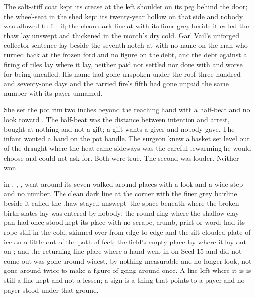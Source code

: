 The salt-stiff coat kept its crease at the left shoulder on its peg behind the door; the wheel-seat in the shed kept its twenty-year hollow on that side and nobody was allowed to fill it; the clean dark line at  with its finer grey beside it called the thaw lay unswept and thickened in the month's dry cold. Garl Vail's unforged collector sentence lay beside the seventh notch at  with no name on the man who turned back at the frozen ford and no figure on the debt, and the debt against a firing of tiles lay where it lay, neither paid nor settled nor done with and worse for being uncalled. His name had gone unspoken under the roof three hundred and seventy-one days and the carried fire's fifth had gone unpaid the same number with its payer unnamed.

She set the pot rim two inches beyond the reaching hand with a half-beat and no look toward . The half-beat was the distance between intention and arrest, bought at nothing and not a gift; a gift wants a giver and nobody gave. The infant wanted a hand on the pot handle. The surgeon knew a basket set level out of the draught where the heat came sideways was the careful rewarming he would choose and could not ask for. Both were true. The second was louder. Neither won.

\scenebreak

 in , , , went around its seven walked-around places with a look and a wide step and no number. The clean dark line at the corner with the finer grey hairline beside it called the thaw stayed unswept; the space beneath  where the broken birth-slates lay was entered by nobody; the round ring where the shallow clay pan had once stood kept its place with no scrape, crumb, print or word;  had its rope stiff in the cold,  skinned over from edge to edge and the silt-clouded plate of ice on  a little out of the path of feet; the field's empty place lay where it lay out on ; and the returning-line place where a hand went in on Seed 15 and did not come out was gone around widest, by nothing measurable and no longer look, not gone around twice to make a figure of going around once. A line left where it is is still a line kept and not a lesson; a sign is a thing that points to a payer and no payer stood under that ground.

